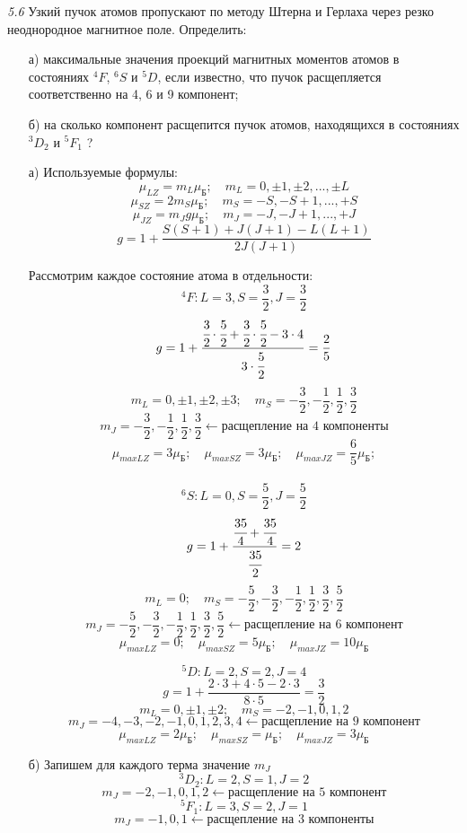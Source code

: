 	\emph{5.6 }
		Узкий пучок атомов пропускают по методу Штерна и Герлаха через резко
		неоднородное магнитное поле. Определить: 
		\vspace*{-1em}
		\begin{itemize}\itemsep-8pt
			\item[а)] максимальные значения проекций магнитных моментов 
			атомов в состояниях \(^4F \), \( ^6S \) и \( ^5D \), если
			известно, что пучок расщепляется соответственно на 4, 6 и 9 компонент;
			\item[б)] на сколько компонент расщепится пучок атомов, 
			находящихся в состояниях \( ^3D_2 \) и \( ^5F_1 \) ?
		\end{itemize}
		\vspace*{-1em}
		\begin{itemize}\itemsep-8pt
			\item[а)] Используемые формулы:
			\[ 
				\mu_{LZ} = m_L\mu_\text{Б};\quad
				m_L = 0, \pm1, \pm2, ..., \pm L 
			\]
			\[ 
				\mu_{SZ} = 2m_S\mu_\text{Б};\quad
				m_S = -S, -S+1, ..., +S  
			\]
			\[ 
				\mu_{JZ} = m_J g\mu_\text{Б};\quad
				m_J = -J, -J+1, ..., +J  
			\]
			\[ g = 1 + \frac{S(S+1)+J(J+1)-L(L+1)}{2J(J+1)} \]

			Рассмотрим каждое состояние атома в отдельности:
			\[ ^4F: L=3, S=\frac{3}{2}, J= \frac{3}{2} \]
			\[ 
				g = 1 + \frac{\cfrac{3}{2}\cdot\cfrac{5}{2} 
				+ \cfrac{3}{2}\cdot\cfrac{5}{2} - 3\cdot4}{3\cdot\cfrac{5}{2}} 
				= \frac{2}{5}  
			\]
			\[ 
				m_L = 0, \pm1, \pm2, \pm3;\quad
				m_S = -\frac{3}{2}, -\frac{1}{2}, \frac{1}{2}, \frac{3}{2}
			\]
			\[
				m_J = -\frac{3}{2}, -\frac{1}{2}, \frac{1}{2}, \frac{3}{2} \leftarrow 
				\text{расщепление на 4 компоненты}
			\]
			\[ 
				\mu_{maxLZ} = 3\mu_\text{Б};\quad
				\mu_{maxSZ} = 3\mu_\text{Б};\quad
				\mu_{maxJZ} = \frac{6}{5}\mu_\text{Б};
			\] \\

			\[ ^6S: L=0, S=\frac{5}{2}, J= \frac{5}{2} \]
			\[ g = 1 + \frac{\cfrac{35}{4}+\cfrac{35}{4}}{\cfrac{35}{2}} = 2\]
			\[ 
				m_L = 0;\quad
				m_S = -\frac{5}{2}, -\frac{3}{2}, -\frac{1}{2}, 
				\frac{1}{2}, \frac{3}{2}, \frac{5}{2}
			\]
			\[
				m_J = -\frac{5}{2}, -\frac{3}{2}, -\frac{1}{2}, \frac{1}{2}, 
				\frac{3}{2}, \frac{5}{2} \leftarrow \text{расщепление на 6 компонент}
			\]
			\[ 
				\mu_{maxLZ} = 0;\quad
				\mu_{maxSZ} = 5\mu_\text{Б};\quad
				\mu_{maxJZ} = 10\mu_\text{Б}
			\]

			\[ ^5D: L=2, S=2, J=4\]
			\[ g = 1 + \frac{2\cdot3 + 4\cdot5 - 2\cdot3}{8\cdot5} = \frac{3}{2}\]
			\[ 
				m_L = 0, \pm1, \pm2;\quad
				m_S = -2, -1, 0, 1, 2
			\]
			\[
				m_J = -4, -3, -2, -1, 0, 1, 2, 3, 4 \leftarrow 
				\text{расщепление на 9 компонент}
			\]
			\[ 
				\mu_{maxLZ} = 2\mu_\text{Б};\quad
				\mu_{maxSZ} = \mu_\text{Б};\quad
				\mu_{maxJZ} = 3\mu_\text{Б}
			\]
			\item[б)] Запишем для каждого терма значение \( m_J \)
			\[ ^3D_2: L=2, S=1, J=2 \]
			\[ m_J = -2, -1, 0, 1, 2 \leftarrow \text{расщепление на 5 компонент} \]
			\[ ^5F_1: L=3, S=2, J=1 \]
			\[ m_J = -1, 0, 1 \leftarrow \text{расщепление на 3 компоненты} \]
		\end{itemize}

